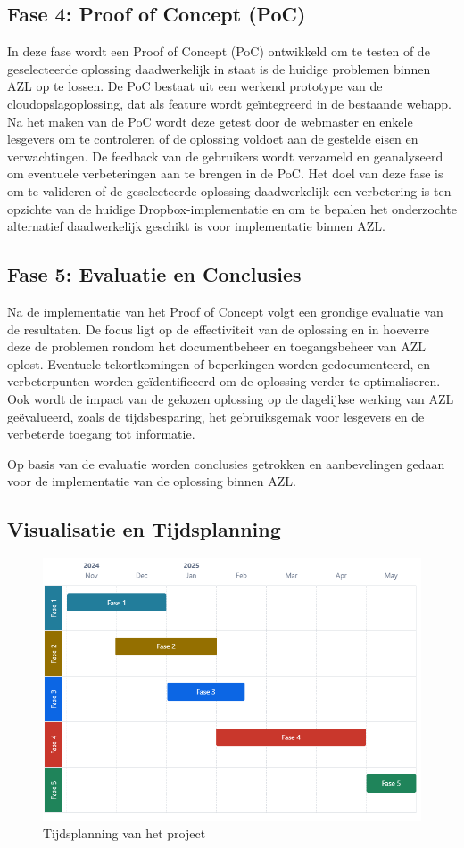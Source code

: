 \subsection{Fase 4: Proof of Concept (PoC)}
In deze fase wordt een Proof of Concept (PoC) ontwikkeld om te testen of de geselecteerde oplossing daadwerkelijk in staat is de huidige problemen binnen AZL op te lossen. De PoC bestaat uit een werkend prototype van de cloudopslagoplossing, dat als feature wordt geïntegreerd in de bestaande webapp. Na het maken van de PoC wordt deze getest door de webmaster en enkele lesgevers om te controleren of de oplossing voldoet aan de gestelde eisen en verwachtingen. De feedback van de gebruikers wordt verzameld en geanalyseerd om eventuele verbeteringen aan te brengen in de PoC. Het doel van deze fase is om te valideren of de geselecteerde oplossing daadwerkelijk een verbetering is ten opzichte van de huidige Dropbox-implementatie en om te bepalen het onderzochte alternatief daadwerkelijk geschikt is voor implementatie binnen AZL.
\subsection{Fase 5: Evaluatie en Conclusies}
Na de implementatie van het Proof of Concept volgt een grondige evaluatie van de resultaten. De focus ligt op de effectiviteit van de oplossing en in hoeverre deze de problemen rondom het documentbeheer en toegangsbeheer van AZL oplost. Eventuele tekortkomingen of beperkingen worden gedocumenteerd, en verbeterpunten worden geïdentificeerd om de oplossing verder te optimaliseren. Ook wordt de impact van de gekozen oplossing op de dagelijkse werking van AZL geëvalueerd, zoals de tijdsbesparing, het gebruiksgemak voor lesgevers en de verbeterde toegang tot informatie.

Op basis van de evaluatie worden conclusies getrokken en aanbevelingen gedaan voor de implementatie van de oplossing binnen AZL.
\subsection{Visualisatie en Tijdsplanning}

\begin{figure}[h!]
    \centering
    \includegraphics[width=.5\textwidth]{../graphics/Chart-Tijd-Visualisatie.png}
    \caption{Tijdsplanning van het project}
    \label{fig:tijdsplanning}
\end{figure}


